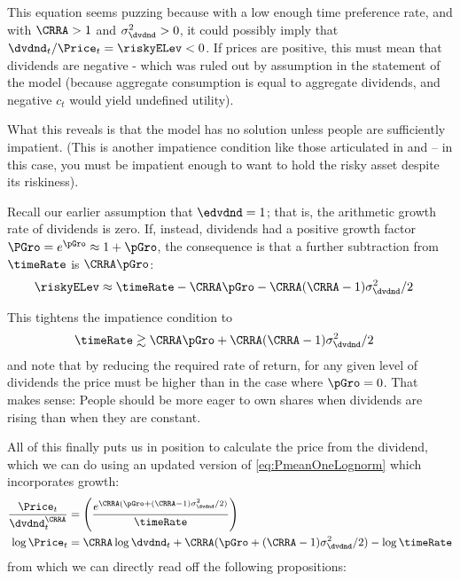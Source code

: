 \documentclass{\handout}
\begin{document}
  This equation seems puzzing because with a low enough time preference rate, and with $\CRRA > 1$ and $\riskyvar > 0$, it could possibly imply that $\dvdnd_{t}/\Price_{t} = \riskyELev < 0$.  If prices are positive, this must mean that dividends are negative - which was ruled out by assumption in the statement of the model (because aggregate consumption is equal to aggregate dividends, and negative $c_{t}$ would yield undefined utility).

  What this reveals is that the model has no solution unless people are sufficiently impatient.  (This is another impatience condition like those articulated in  and  -- in this case, you must be impatient enough to want to hold the risky asset despite its riskiness).
  
  Recall our earlier assumption that $\edvdnd=1$; that is, the arithmetic growth rate of dividends is zero.  If, instead, dividends had a positive growth factor $\PGro=e^{\pGro}\approx 1+\pGro$, the consequence is that a further subtraction from $\timeRate$ is $\CRRA \pGro$:
  \begin{equation}\begin{gathered}\begin{aligned}
      \riskyELev & \approx \timeRate - \CRRA \pGro -\CRRA (\CRRA-1)\riskyvar/2
      \end{aligned}\end{gathered}\end{equation}

  This tightens the impatience condition to
  \begin{equation}\begin{gathered}\begin{aligned}
        \timeRate & \gtrsim \CRRA \pGro + \CRRA (\CRRA-1)\riskyvar/2
      \end{aligned}\end{gathered}\end{equation}
and note that by reducing the required rate of return, for any given level of dividends the price must be higher than in the case where $\pGro=0$.  That makes sense: People should be more eager to own shares when dividends are rising than when they are constant.

All of this finally puts us in position to calculate the price from the dividend, which we can do using an updated version of \eqref{eq:PmeanOneLognorm} which incorporates growth:
\begin{equation}\begin{gathered}\begin{aligned}
  \frac{\Price_{t}}{\dvdnd_{t}^{\CRRA}} 
 & =  \left(\frac{e^{\CRRA(\pGro+(\CRRA-1)\riskyvar/2)}}{\timeRate}\right)\label{eq:PLognormGro}
 \\ \log \Price_{t} & =  \CRRA \log \dvdnd_{t} + \CRRA(\pGro+(\CRRA-1)\riskyvar/2)- \log \timeRate 
\end{aligned}\end{gathered}\end{equation}
from which we can directly read off the following propositions:
\medskip
\end{document}
